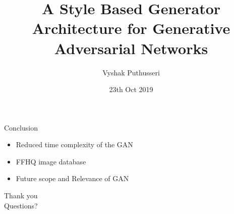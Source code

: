 \documentclass[10pt]{beamer}
\title{A Style Based Generator Architecture for Generative Adversarial Networks}
\date{\regno}
\author{Vyshak Puthusseri}
\institute{TVE17MCA054 \\
\text{MCA CET }\\
S5 : 51
}
\date{23th Oct 2019}
\begin{document}
\maketitle









\begin{frame}{Conclusion}
    \begin{itemize}
        \item Reduced time complexity of the GAN 
        \item FFHQ image database
        \item Future scope and Relevance of GAN
    \end{itemize}
\end{frame}


\begin{frame}[standout]
  Thank you \\ Questions?
\end{frame}
\end{document}
